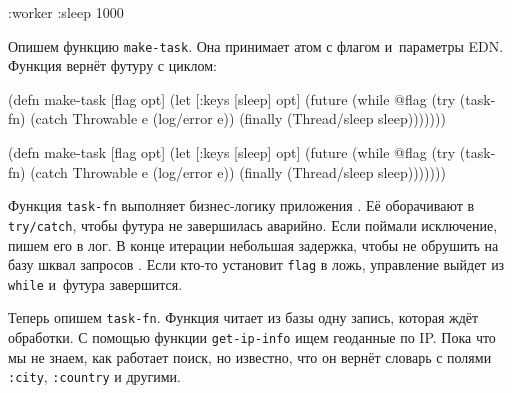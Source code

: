\begin{english}
  \begin{clojure}
{:worker {:sleep 1000}}
  \end{clojure}
\end{english}


\label{make-task}

Опишем функцию \verb|make-task|. Она принимает атом с флагом и~параметры
EDN. Функция вернёт футуру с циклом:

\ifnarrow

\begin{english}
  \begin{clojure/lines}
(defn make-task
  [flag opt]
  (let [{:keys [sleep]} opt]
    (future
      (while @flag
        (try
          (task-fn)
          (catch Throwable e
            (log/error e))
          (finally
            (Thread/sleep
              sleep)))))))
  \end{clojure/lines}
\end{english}

\else

\begin{english}
  \begin{clojure/lines}
(defn make-task
  [flag opt]
  (let [{:keys [sleep]} opt]
    (future
      (while @flag
        (try
          (task-fn)
          (catch Throwable e
            (log/error e))
          (finally
            (Thread/sleep sleep)))))))
  \end{clojure/lines}
\end{english}

\fi

Функция \verb|task-fn| выполняет бизнес-логику приложения . Её
оборачивают в \verb|try/catch|, чтобы футура не завершилась аварийно. Если
поймали исключение, пишем его в лог. В конце итерации небольшая задержка, чтобы
не обрушить на базу шквал запросов . Если кто-то установит
\verb|flag| в ложь, управление выйдет из \verb|while| и~футура завершится.

Теперь опишем \verb|task-fn|. Функция читает из базы одну запись, которая
ждёт обработки. С помощью функции \verb|get-ip-info| ищем геоданные по
IP. Пока что мы не знаем, как работает поиск, но известно, что он вернёт словарь
с полями \verb|:city|, \verb|:country| и другими.


\ifnarrow

